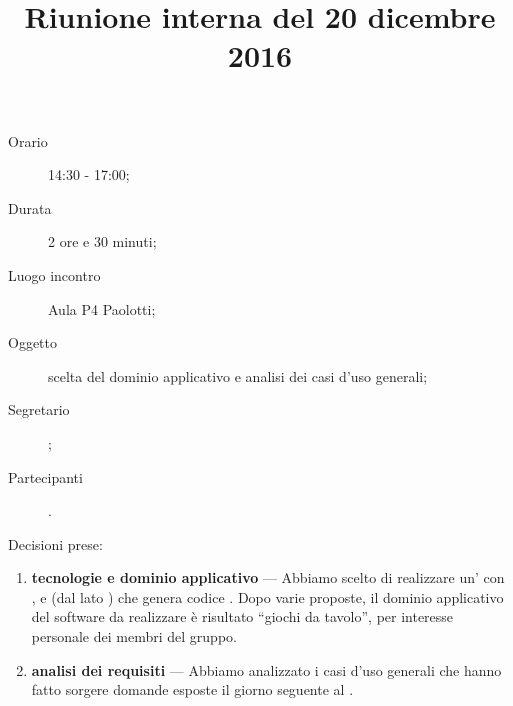 


\author{\PB}
\supervisor{\MM}
\dest{\ALL}
\title{Riunione interna del 20 dicembre 2016}



\maketitle

\begin{description}
	\item[Orario] 14:30 - 17:00;
	\item[Durata] 2 ore e 30 minuti;
	\item[Luogo incontro] Aula P4 Paolotti;
	\item[Oggetto] scelta del dominio applicativo e analisi dei casi d'uso generali;
	\item[Segretario] \PB; 
	\item[Partecipanti] \ALL.
\end{description}

Decisioni prese:
\begin{enumerate}
	\item \textbf{tecnologie e dominio applicativo} --- Abbiamo scelto di realizzare un' con ,  e  (dal lato ) che genera codice . Dopo varie proposte, il dominio applicativo del software da realizzare è risultato “giochi da tavolo”, per interesse personale dei membri del gruppo.
	\item \textbf{analisi dei requisiti} --- Abbiamo analizzato i casi d'uso generali che hanno fatto sorgere domande esposte il giorno seguente al \GP.
\end{enumerate}


